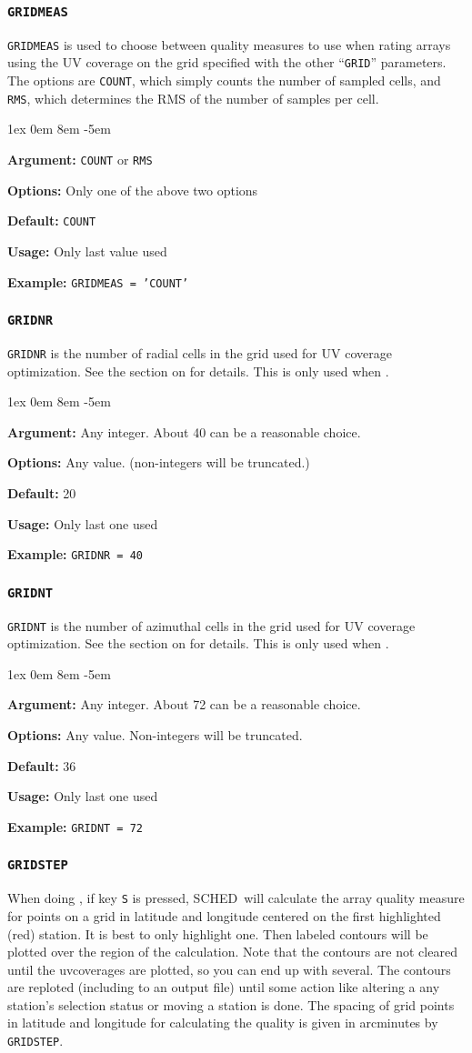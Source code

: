 \documentclass{report}
\newcommand{\schedb}{{\sc SCHED~}}
\newcommand{\rcwbox}[5]{
  \begin{list}{}{\parsep 1ex  \itemsep 0em
                 \leftmargin 8em  \itemindent -5em }
    \item {\bf Argument:} #1
    \item {\bf Options:}  #2
    \item {\bf Default:}  #3
    \item {\bf Usage:}    #4
    \item {\bf Example:}  #5
  \end{list}
}
\begin{document}
\subsubsection{\label{MP:GRIDMEAS}{\tt GRIDMEAS}}

{\tt GRIDMEAS} is used to choose between quality measures to use
when rating arrays using the UV coverage on the grid specified
with the other ``{\tt GRID}'' parameters.  The options are
{\tt COUNT}, which simply counts the number of sampled cells,
and {\tt RMS}, which determines the RMS of the number of samples
per cell.

\rcwbox
{{\tt COUNT} or {\tt RMS}}
{Only one of the above two options}
{{\tt COUNT}}
{Only last value used}
{{\tt GRIDMEAS = 'COUNT'}}


\subsubsection{\label{MP:GRIDNR}{\tt GRIDNR}}

{\tt GRIDNR} is the number of radial cells in the grid used for UV
coverage optimization.  See the section on  for details. This is only used when
.

\rcwbox
{Any integer.  About 40 can be a reasonable choice.}
{Any value. (non-integers will be truncated.)}
{20}
{Only last one used}
{{\tt GRIDNR = 40}}

\subsubsection{\label{MP:GRIDNT}{\tt GRIDNT}}

{\tt GRIDNT} is the number of azimuthal cells in the grid used for UV
coverage optimization.  See the section on  for details.  This is only used when
.

\rcwbox
{Any integer.  About 72 can be a reasonable choice.}
{Any value. Non-integers will be truncated.}
{36}
{Only last one used}
{{\tt GRIDNT = 72}}

\subsubsection{\label{MP:GRIDSTEP}{\tt GRIDSTEP}}

When doing , if key {\tt S}
is pressed, \schedb will calculate the array quality measure for
points on a grid in latitude and longitude centered on the first
highlighted (red) station.  It is best to only highlight one.  Then
labeled contours will be plotted over the region of the calculation.
Note that the contours are not cleared until the uvcoverages are
plotted, so you can end up with several.  The contours are reploted
(including to an output file) until some action like altering a any
station's selection status or moving a station is done.  The spacing
of grid points in latitude and longitude for calculating the quality
is given in arcminutes by {\tt GRIDSTEP}.
\end{document}
